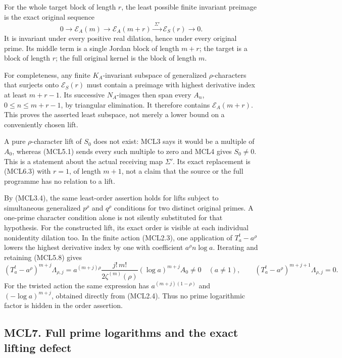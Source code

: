 For the whole target block of length \(r\), the least possible finite
invariant preimage is the exact original sequence \[
 \boxed{
 0\longrightarrow\mathcal E_A(m)
 \longrightarrow\mathcal E_A(m+r)
 \xrightarrow{\ \Sigma'\ }\mathcal E_S(r)
 \longrightarrow0.
 }
 \tag{MCL6.3}
\] It is invariant under every positive real dilation, hence under every
original prime. Its middle term is a single Jordan block of length
\(m+r\); the target is a block of length \(r\); the full original kernel
is the block of length \(m\).

For completeness, any finite \(K_A\)-invariant subspace of generalized
\(\rho\)-characters that surjects onto \(\mathcal E_S(r)\) must contain
a preimage with highest derivative index at least \(m+r-1\). Its
successive \(N_A\)-images then span every \(A_n\), \(0\le n\le m+r-1\),
by triangular elimination. It therefore contains \(\mathcal E_A(m+r)\).
This proves the asserted least subspace, not merely a lower bound on a
conveniently chosen lift.

A pure \(\rho\)-character lift of \(S_0\) does not exist: MCL3 says it
would be a multiple of \(A_0\), whereas (MCL5.1) sends every such
multiple to zero and MCL4 gives \(S_0\ne0\). This is a statement about
the actual receiving map \(\Sigma'\). Its exact replacement is (MCL6.3)
with \(r=1\), of length \(m+1\), not a claim that the source or the full
programme has no relation to a lift.

By (MCL3.4), the same least-order assertion holds for lifts subject to
simultaneous generalized \(p^\rho\) and \(q^\rho\) conditions for two
distinct original primes. A one-prime character condition alone is not
silently substituted for that hypothesis. For the constructed lift, its
exact order is visible at each individual nonidentity dilation too. In
the finite action (MCL2.3), one application of \(T_a^t-a^\rho\) lowers
the highest derivative index by one with coefficient \(a^\rho n\log a\).
Iterating and retaining (MCL5.8) gives \[
 (T_a^t-a^\rho)^{m+j}\Lambda_{\rho,j}
 =a^{(m+j)\rho}
 \frac{j!\,m!}{2\zeta^{(m)}(\rho)}
 (\log a)^{m+j}A_0\ne0\quad(a\ne1),
 \qquad
 (T_a^t-a^\rho)^{m+j+1}\Lambda_{\rho,j}=0.
 \tag{MCL6.4}
\] For the twisted action the same expression has \(a^{(m+j)(1-\rho)}\)
and \((-\log a)^{m+j}\), obtained directly from (MCL2.4). Thus no prime
logarithmic factor is hidden in the order assertion.

\subsection{MCL7. Full prime logarithms and the exact lifting
defect}\label{mcl7.-full-prime-logarithms-and-the-exact-lifting-defect}

